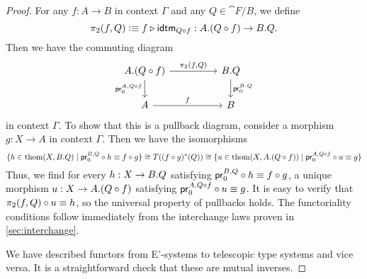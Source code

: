 \begin{proof}
For any $f:A\to B$ in context $\Gamma$ and any $Q\in\cat{F}/B$, we define
\begin{equation*}
\pi_2(f,Q)\defeq \jvcomp{\jcomp{A}{f}{Q}}{f}{\tfid{\jcomp{A}{f}{Q}}}
  : \ctxext{A}{\jcomp{A}{f}{Q}}\to\ctxext{B}{Q}.
\end{equation*}
Then we have the commuting diagram
\begin{equation*}
\begin{tikzcd}[column sep=huge]
\ctxext{A}{\jcomp{A}{f}{Q}} \arrow[r,"{\pi_2(f,Q)}"] \arrow[d,swap,"{\cprojfstf{A}{\jcomp{A}{f}{Q}}}"] & \ctxext{B}{Q} \arrow[d,"{\cprojfstf{B}{Q}}"] \\
A \arrow[r,"f"] & B
\end{tikzcd}
\end{equation*}
in context $\Gamma$. To show that this is a pullback diagram, consider a
morphism $g:X\to A$ in context $\Gamma$. Then we have the isomorphisms
\begin{equation*}
\{h\in\thom{X}{\ctxext{B}{Q}}\mid \jcomp{X}{h}{\cprojfstf{B}{Q}}\jdeq\jcomp{X}{g}{f}\}
  \cong
T((\jcomp{X}{g}{f})^\ast(Q))
  \cong
\{u\in\thom{X}{\ctxext{A}{\jcomp{A}{f}{Q}}}\mid\jcomp{X}{u}{\cprojfstf{A}{\jcomp{A}{f}{Q}}}\jdeq g\}
\end{equation*}
Thus, we find for every $h:X\to\ctxext{B}{Q}$ satisfying
$\jcomp{X}{h}{\cprojfstf{B}{Q}}\jdeq\jcomp{X}{g}{f}$, a unique morphism
$u:X\to\ctxext{A}{\jcomp{A}{f}{Q}}$ satisfying
$\jcomp{X}{u}{\cprojfstf{A}{\jcomp{A}{f}{Q}}}\jdeq g$. It is easy to verify
that $\jcomp{X}{u}{\pi_2(f,Q)}\jdeq h$, so the universal property of pullbacks
holds. The functoriality conditions follow immediately from the interchange
laws proven in \autoref{sec:interchange}.

We have described functors from E'-systems to telescopic type systems and vice versa. It is
a straightforward check that these are mutual inverses.
\end{proof}

